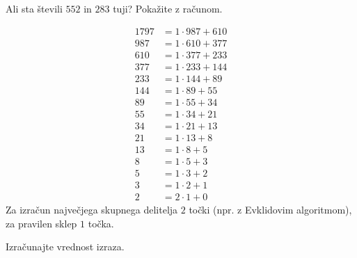 \documentclass[addpoints]{exam}
\begin{document}
\begin{questions}


        \question[3]
        Ali sta števili $552$ in $283$ tuji? Pokažite z računom.
        
        \begin{solution}
            \begin{align*}
                1797&=1\cdot 987+610\\
                987&=1\cdot 610+377 \\
                610&=1\cdot 377+233 \\
                377&=1\cdot 233+144 \\
                233&=1\cdot 144+89 \\
                144&=1\cdot 89+55 \\
                89&=1\cdot 55+34 \\
                55&=1\cdot 34+21 \\
                34&=1\cdot 21+13 \\
                21&=1\cdot 13+8 \\
                13&=1\cdot 8+5 \\
                8&=1\cdot 5+3 \\
                5&=1\cdot 3+2 \\
                3&=1\cdot 2+1 \\
                2&=2\cdot 1+0
            \end{align*}
            Za izračun največjega skupnega delitelja $2$ točki (npr. z Evklidovim algoritmom), za pravilen sklep $1$ točka.
        \end{solution}
    

    \question
    Izračunajte vrednost izraza.
\end{questions}
\end{document}
